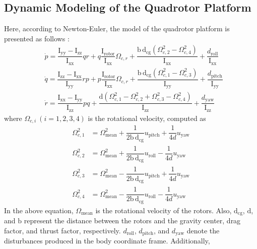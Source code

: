 \documentclass[3p]{elsarticle}
\begin{document}
\subsection{Dynamic Modeling of the Quadrotor Platform}
\noindent Here, according to Newton-Euler, the model of the quadrotor platform is presented as follows \cite{4399042, article_Bouabdallah}:
\begin{align}
&\dot p = \dfrac{\mathrm{I}_{\text{yy}} - \mathrm{I}_{\text{zz}}}
{\mathrm{I}_{\text{xx}}} qr + q \dfrac{\mathrm{I}_{\text{rotor}}}
{\mathrm{I}_{\text{xx}}}\Omega_{c, r} + \dfrac{\mathrm{b\,d}_{\text{cg}} (\Omega_{c, 2}^2 - \Omega_{c, 4}^2)}{\mathrm{I}
_{\text{xx}}} + \dfrac{d_{\text{roll}}}{\mathrm{I}_{\text{xx}}}
\\
&\dot q = \dfrac{\mathrm{I}_{\text{zz}} - 
\mathrm{I}_{\text{xx}}}{\mathrm{I}_{\text{yy}}} rp +
p \dfrac{\mathrm{I}_{\text{rotor}}}{\mathrm{I}_{\text{xx}}}\Omega_{c, r} + 
\dfrac{\mathrm{b\,d}_{\text{cg}} (\Omega_{c, 1}^2 - \Omega_{c, 3}^2)}{\mathrm{I}_{\text{yy}}} +
\dfrac{d_{\text{pitch}}}{\mathrm{I}_{\text{yy}}}
\\
&\dot r = \dfrac{\mathrm{I}_{\text{xx}} -
\mathrm{I}_{\text{yy}}}{\mathrm{I}_{\text{zz}}} pq 
+  \dfrac{\mathrm{d} (\Omega_{c, 1}^2 - \Omega_{c, 2}^2 + \Omega_{c, 3}^2 - \Omega_{c, 4}^2)}{\mathrm{I}_{\text{zz}}} 
+ \dfrac{d_{\text{yaw}}}{\mathrm{I}_{\text{zz}}}
\end{align}
where $\Omega_{c, i}~(i=1, 2, 3, 4)$ is the rotational velocity, computed as
\begin{align}
    \Omega_{c, 1}^2 &= \Omega_{\text{mean}}^2 + \dfrac{1}{2\mathrm{b\,d}_{\text{cg}}}u_{\text{pitch}} + \dfrac{1}{4d}u_{\text{yaw}} \\
    \Omega_{c, 2}^2 &= \Omega_{\text{mean}}^2 + \dfrac{1}{2\mathrm{b\,d}_{\text{cg}}}u_{\text{roll}} - \dfrac{1}{4d}u_{\text{yaw}}\\
    \Omega_{c, 3}^2 &= \Omega_{\text{mean}}^2 - \dfrac{1}{2\mathrm{b\,d}_{\text{cg}}}u_{\text{pitch}} + \dfrac{1}{4d}u_{\text{yaw}} \\
    \Omega_{c, 4}^2 &= \Omega_{\text{mean}}^2 - \dfrac{1}{2\mathrm{b\,d}_{\text{cg}}}u_{\text{roll}} - \dfrac{1}{4d}u_{\text{yaw}}
\end{align}
In the above equation, $\Omega_{\text{mean}}$ is the rotational velocity of the rotors. Also, $\mathrm{d}_{\text{cg}}$, $\text{d}$, and $\text{b}$ represent the distance between the rotors and the gravity center, drag factor, and thrust factor, respectively.
$d_{\text{roll}}$, $d_{\text{pitch}}$, and $d_{\text{yaw}}$ denote the disturbances produced in the body coordinate frame. Additionally,
\end{document}
